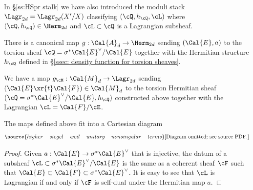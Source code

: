 In \S\ref{ss:HSpr stalk} we have also introduced the moduli stack $\Lagr_{2d}=\Lagr_{2d}(X'/X)$ classifying $(\cQ,h_{\cQ}, \cL)$ where $(\cQ,h_{\cQ})\in \Herm_{2d}$ and $\cL\subset \cQ$ is a Lagrangian subsheaf.


There is a canonical map $g: \Cal{A}_d \rightarrow \Herm_{2d}$ sending $(\Cal{E},a)$ to the torsion sheaf $\cQ=\sigma^* \Cal{E}^{\vee}/\Cal{E}$ together with the Hermitian structure $h_{\cQ}$ defined in \S \ref{ssec: density function for torsion sheaves}.





We have a map $g_{\cM}: \Cal{M}_d \rightarrow \Lagr_{2d}$ sending $(\Cal{E} \xr{t} \Cal{F}) \in \Cal{M}_d$ to the torsion Hermitian sheaf $(\cQ=\sigma^* \Cal{E}^{\vee}/\Cal{E}, h_{\cQ})$ constructed above together with the Lagrangian  $\cL=\Cal{F}/\cE$.


\begin{lemma}
\notready\label{lem: hitchin cartesian} The maps defined above fit into a Cartesian diagram
\begin{equation}\label{eq: hitchin cartesian}
\source{higher-siegel-weil-unitary-nonsingular-terms}
\text{[Diagram omitted; see source PDF.]}
\end{equation}
\end{lemma}

\begin{proof} Given $a: \Cal{E} \rightarrow \sigma^* \Cal{E}^{\vee}$ that is injective, the datum of a subsheaf $\cL\subset \sigma^* \Cal{E}^{\vee}/\Cal{E}$ is the same as a coherent sheaf $\cF$ such that $\Cal{E} \subset \Cal{F} \subset \sigma^* \Cal{E}^{\vee}$. It is easy to see that $\cL$ is Lagrangian if and only if $\cF$ is self-dual under the Hermitian map $a$.
\end{proof}



